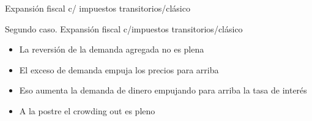 \documentclass{beamer}
\begin{document}
\begin{frame}{Expansión fiscal c/ impuestos transitorios/clásico}
\begin{center}
\begin{figure}[H]
\begin{center}
\begin{minipage}[b]{0.45\textwidth}
\begin{center}
\begin{tikzpicture}[scale=0.4]
\end{tikzpicture}
\end{center}
    \end{minipage}
\end{center}
\vspace{0.7cm}
\label{fig:C36.2}
\end{figure}
\end{center} 

\end{frame}

\begin{frame}{Segundo caso. Expansión fiscal c/impuestos transitorios/clásico}
   
\begin{itemize}
    \item La reversión de la demanda agregada no es plena
    \item El exceso de demanda empuja los precios para arriba
    \item Eso aumenta la demanda de dinero empujando para arriba la tasa de interés 
    \item A la postre el crowding out es pleno
    \end{itemize}
\end{frame}
\end{document}
